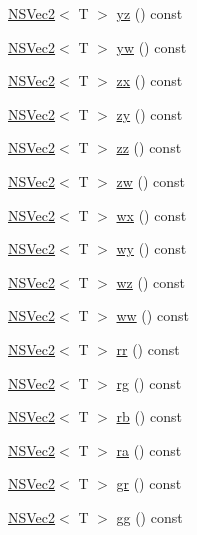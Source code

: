 \begin{DoxyCompactItemize}
\item 
\hyperlink{structNSVec2}{N\-S\-Vec2}$<$ T $>$ \hyperlink{structNSVec4_a6380a85ef86f586af599f6154777042e}{yz} () const 
\item 
\hyperlink{structNSVec2}{N\-S\-Vec2}$<$ T $>$ \hyperlink{structNSVec4_ad12a5ee587fd3e403545f887cdb15a01}{yw} () const 
\item 
\hyperlink{structNSVec2}{N\-S\-Vec2}$<$ T $>$ \hyperlink{structNSVec4_ad1593fad2c22062a0ab6e9e3a0285001}{zx} () const 
\item 
\hyperlink{structNSVec2}{N\-S\-Vec2}$<$ T $>$ \hyperlink{structNSVec4_aab1c8ca2f5eafd987407e0c2b9d43934}{zy} () const 
\item 
\hyperlink{structNSVec2}{N\-S\-Vec2}$<$ T $>$ \hyperlink{structNSVec4_aaeb2d414dea5b72f5b4ce3316c4da2b0}{zz} () const 
\item 
\hyperlink{structNSVec2}{N\-S\-Vec2}$<$ T $>$ \hyperlink{structNSVec4_af5912d46333b72a29f6ff8e7429dd339}{zw} () const 
\item 
\hyperlink{structNSVec2}{N\-S\-Vec2}$<$ T $>$ \hyperlink{structNSVec4_a1c19d9eade60787e8a09c12c1f68bac2}{wx} () const 
\item 
\hyperlink{structNSVec2}{N\-S\-Vec2}$<$ T $>$ \hyperlink{structNSVec4_a2c0375aeb61746707d8de89de557c7b3}{wy} () const 
\item 
\hyperlink{structNSVec2}{N\-S\-Vec2}$<$ T $>$ \hyperlink{structNSVec4_a1c7afe544ec36be1c90425e9880e9fdd}{wz} () const 
\item 
\hyperlink{structNSVec2}{N\-S\-Vec2}$<$ T $>$ \hyperlink{structNSVec4_ad546f07b3f87ef511ce95277fda8b231}{ww} () const 
\item 
\hyperlink{structNSVec2}{N\-S\-Vec2}$<$ T $>$ \hyperlink{structNSVec4_ab92de843ed0514a180fd6e964d3fbe5d}{rr} () const 
\item 
\hyperlink{structNSVec2}{N\-S\-Vec2}$<$ T $>$ \hyperlink{structNSVec4_a6d79918beff1073c7134de969e7f716b}{rg} () const 
\item 
\hyperlink{structNSVec2}{N\-S\-Vec2}$<$ T $>$ \hyperlink{structNSVec4_a2076e433d5f1d80636ba0267c2fd865d}{rb} () const 
\item 
\hyperlink{structNSVec2}{N\-S\-Vec2}$<$ T $>$ \hyperlink{structNSVec4_a141351713b4b5019eb364941dd8f8372}{ra} () const 
\item 
\hyperlink{structNSVec2}{N\-S\-Vec2}$<$ T $>$ \hyperlink{structNSVec4_a1f739ba82f83720a7bcc7a3b071c84b7}{gr} () const 
\item 
\hyperlink{structNSVec2}{N\-S\-Vec2}$<$ T $>$ \hyperlink{structNSVec4_a7498697a7a36460537289e65ee5681ba}{gg} () const 

\end{DoxyCompactItemize}
